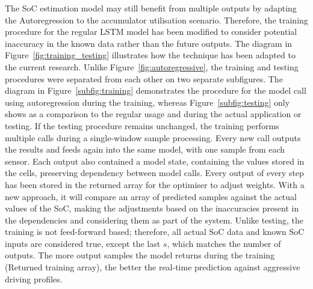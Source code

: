 %
%
The SoC estimation model may still benefit from multiple outputs by adapting the Autoregression to the accumulator utilisation scenario.
Therefore, the training procedure for the regular LSTM model has been modified to consider potential inaccuracy in the known data rather than the future outputs.
The diagram in Figure~\ref{fig:training_testing} illustrates how the technique has been adapted to the current research.
Unlike Figure~\ref{fig:autoregressive}, the training and testing procedures were separated from each other on two separate subfigures.
The diagram in \mbox{Figure~\ref{subfig:training}} demonstrates the procedure for the model call using autoregression during the training, whereas Figure~\ref{subfig:testing} only shows as a comparison to the regular usage and during the actual application or testing.
If the testing procedure remains unchanged, the training performs multiple calls during a single-window sample processing.
Every new call outputs the results and feeds again into the same model, with one sample from each sensor.
Each output also contained a model state, containing the values stored in the cells, preserving dependency between model calls.
Every output of every step has been stored in the returned array for the optimiser to adjust weights.
With a new approach, it will compare an array of predicted samples against the actual values of the SoC, making the adjustments based on the inaccuracies present in the dependencies and considering them as part of the system.
Unlike testing, the training is not feed-forward based; therefore, all actual SoC data and known SoC inputs are considered true, except the last $s$, which matches the number of outputs.
The more output samples the model returns during the training (Returned training array), the better the real-time prediction against aggressive driving profiles.
